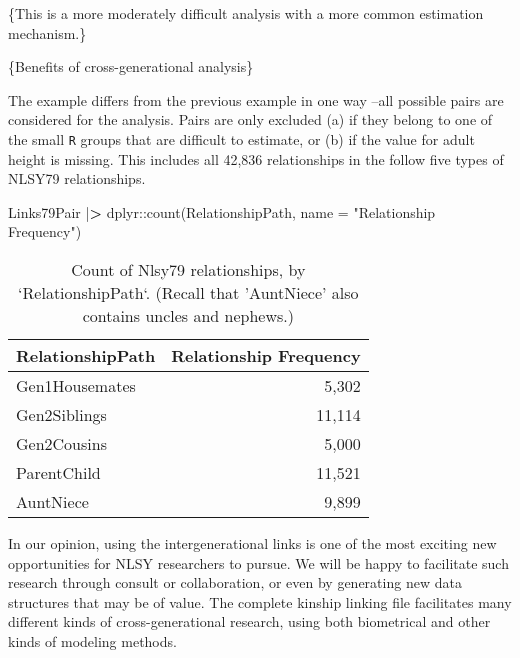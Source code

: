 \documentclass[smallextended]{svjour3}       %
\newenvironment{Shaded}{\begin{snugshade}}{\end{snugshade}}
\newcommand{\AttributeTok}[1]{\textcolor[rgb]{0.77,0.63,0.00}{#1}}
\newcommand{\ErrorTok}[1]{\textcolor[rgb]{0.64,0.00,0.00}{\textbf{#1}}}
\newcommand{\FunctionTok}[1]{\textcolor[rgb]{0.00,0.00,0.00}{#1}}
\newcommand{\NormalTok}[1]{#1}
\newcommand{\SpecialCharTok}[1]{\textcolor[rgb]{0.00,0.00,0.00}{#1}}
\newcommand{\StringTok}[1]{\textcolor[rgb]{0.31,0.60,0.02}{#1}}
\begin{document}
\{This is a more moderately difficult analysis with a more common
estimation mechanism.\}

\{Benefits of cross-generational analysis\}

The example differs from the previous example in one way --all possible
pairs are considered for the analysis. Pairs are only excluded (a) if
they belong to one of the small \texttt{R} groups that are difficult to
estimate, or (b) if the value for adult height is missing. This includes
all 42,836 relationships in the follow five types of NLSY79
relationships.

\begin{Shaded}
\begin{Highlighting}[]
\NormalTok{Links79Pair }\SpecialCharTok{|}\ErrorTok{\textgreater{}} 
\NormalTok{  dplyr}\SpecialCharTok{::}\FunctionTok{count}\NormalTok{(RelationshipPath, }\AttributeTok{name =} \StringTok{"Relationship Frequency"}\NormalTok{) }
\end{Highlighting}
\end{Shaded}

\begin{table}

\caption{\label{tab:unnamed-chunk-6}Count of Nlsy79 relationships, by `RelationshipPath`.  (Recall that 'AuntNiece' also contains uncles and nephews.)}
\centering
\begin{tabular}[t]{l|r}
\hline
RelationshipPath & Relationship Frequency\\
\hline
Gen1Housemates & 5,302\\
\hline
Gen2Siblings & 11,114\\
\hline
Gen2Cousins & 5,000\\
\hline
ParentChild & 11,521\\
\hline
AuntNiece & 9,899\\
\hline
\end{tabular}
\end{table}

In our opinion, using the intergenerational links is one of the most
exciting new opportunities for NLSY researchers to pursue. We will be
happy to facilitate such research through consult or collaboration, or
even by generating new data structures that may be of value. The
complete kinship linking file facilitates many different kinds of
cross-generational research, using both biometrical and other kinds of
modeling methods.
\end{document}
